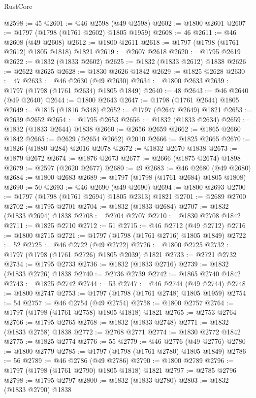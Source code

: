 \begin{lexlean}{RustCore}
\begin{coremodule}
@2598 := 45
@2601 := @46 @2598 (@49 @2598)
@2602 := @1800 @2601
@2607 := @1797 (@1798 (@1761 @2602) @1805 @1959)
@2608 := 46
@2611 := @46 @2608 (@49 @2608)
@2612 := @1800 @2611
@2618 := @1797 (@1798 (@1761 @2612) @1805 @1818) @1821
@2619 := @2607 @2618
@2620 := @1795 @2619
@2622 := @1832 (@1833 @2602)
@2625 := @1832 (@1833 @2612) @1838
@2626 := @2622 @2625
@2628 := @1830 @2626 @1842
@2629 := @1825 @2628
@2630 := 47
@2633 := @46 @2630 (@49 @2630)
@2634 := @1800 @2633
@2639 := @1797 (@1798 (@1761 @2634) @1805 @1849)
@2640 := 48
@2643 := @46 @2640 (@49 @2640)
@2644 := @1800 @2643
@2647 := @1798 (@1761 @2644) @1805
@2649 := @1815 (@1816 @348)
@2652 := @1797 (@2647 @2649) @1821
@2653 := @2639 @2652
@2654 := @1795 @2653
@2656 := @1832 (@1833 @2634)
@2659 := @1832 (@1833 @2644) @1838
@2660 := @2656 @2659
@2662 := @1865 @2660 @1842
@2665 := @2629 (@2654 @2662) @2010
@2666 := @1825 @2665
@2670 := @1826 (@1880 @284) @2016 @2078
@2672 := @1832 @2670 @1838
@2673 := @1879 @2672
@2674 := @1876 @2673
@2677 := @2666 (@1875 @2674) @1898
@2679 := @2597 (@2620 @2677)
@2680 := 49
@2683 := @46 @2680 (@49 @2680)
@2684 := @1800 @2683
@2689 := @1797 (@1798 (@1761 @2684) @1805 @1808)
@2690 := 50
@2693 := @46 @2690 (@49 @2690)
@2694 := @1800 @2693
@2700 := @1797 (@1798 (@1761 @2694) @1805 @2313) @1821
@2701 := @2689 @2700
@2702 := @1795 @2701
@2704 := @1832 (@1833 @2684)
@2707 := @1832 (@1833 @2694) @1838
@2708 := @2704 @2707
@2710 := @1830 @2708 @1842
@2711 := @1825 @2710
@2712 := 51
@2715 := @46 @2712 (@49 @2712)
@2716 := @1800 @2715
@2721 := @1797 (@1798 (@1761 @2716) @1805 @1849)
@2722 := 52
@2725 := @46 @2722 (@49 @2722)
@2726 := @1800 @2725
@2732 := @1797 (@1798 (@1761 @2726) @1805 @2039) @1821
@2733 := @2721 @2732
@2734 := @1795 @2733
@2736 := @1832 (@1833 @2716)
@2739 := @1832 (@1833 @2726) @1838
@2740 := @2736 @2739
@2742 := @1865 @2740 @1842
@2743 := @1825 @2742
@2744 := 53
@2747 := @46 @2744 (@49 @2744)
@2748 := @1800 @2747
@2753 := @1797 (@1798 (@1761 @2748) @1805 @1959)
@2754 := 54
@2757 := @46 @2754 (@49 @2754)
@2758 := @1800 @2757
@2764 := @1797 (@1798 (@1761 @2758) @1805 @1818) @1821
@2765 := @2753 @2764
@2766 := @1795 @2765
@2768 := @1832 (@1833 @2748)
@2771 := @1832 (@1833 @2758) @1838
@2772 := @2768 @2771
@2774 := @1830 @2772 @1842
@2775 := @1825 @2774
@2776 := 55
@2779 := @46 @2776 (@49 @2776)
@2780 := @1800 @2779
@2785 := @1797 (@1798 (@1761 @2780) @1805 @1849)
@2786 := 56
@2789 := @46 @2786 (@49 @2786)
@2790 := @1800 @2789
@2796 := @1797 (@1798 (@1761 @2790) @1805 @1818) @1821
@2797 := @2785 @2796
@2798 := @1795 @2797
@2800 := @1832 (@1833 @2780)
@2803 := @1832 (@1833 @2790) @1838

\end{coremodule}
\end{lexlean}
